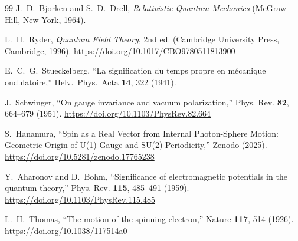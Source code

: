 \documentclass[%
 reprint,
 amsmath,amssymb,
 aps,
 prb,
]{revtex4-2}
\numberwithin{equation}{section}
\begin{document}
\begin{thebibliography}{99}
J.~D.~Bjorken and S.~D.~Drell,
\textit{Relativistic Quantum Mechanics}
(McGraw-Hill, New York, 1964).

L.~H.~Ryder,
\textit{Quantum Field Theory}, 2nd ed.
(Cambridge University Press, Cambridge, 1996).
\href{https://doi.org/10.1017/CBO9780511813900}{https://doi.org/10.1017/CBO9780511813900}

E.~C.~G.~Stueckelberg,
``La signification du temps propre en m\'ecanique ondulatoire,''
Helv.\ Phys.\ Acta {\bf 14}, 322 (1941).

J.~Schwinger,
``On gauge invariance and vacuum polarization,''
Phys. Rev. \textbf{82}, 664--679 (1951).
\href{https://doi.org/10.1103/PhysRev.82.664}{https://doi.org/10.1103/PhysRev.82.664}

S.~Hanamura,
``Spin as a Real Vector from Internal Photon-Sphere Motion: Geometric Origin of U(1) Gauge and SU(2) Periodicity,''
Zenodo (2025).
\href{https://doi.org/10.5281/zenodo.17765238}{https://doi.org/10.5281/zenodo.17765238}

Y.~Aharonov and D.~Bohm,
``Significance of electromagnetic potentials in the quantum theory,''
Phys. Rev. \textbf{115}, 485--491 (1959).
\href{https://doi.org/10.1103/PhysRev.115.485}{https://doi.org/10.1103/PhysRev.115.485}

L.~H.~Thomas,
``The motion of the spinning electron,''
Nature \textbf{117}, 514 (1926).
\href{https://doi.org/10.1038/117514a0}{https://doi.org/10.1038/117514a0}


\end{thebibliography}
\end{document}
